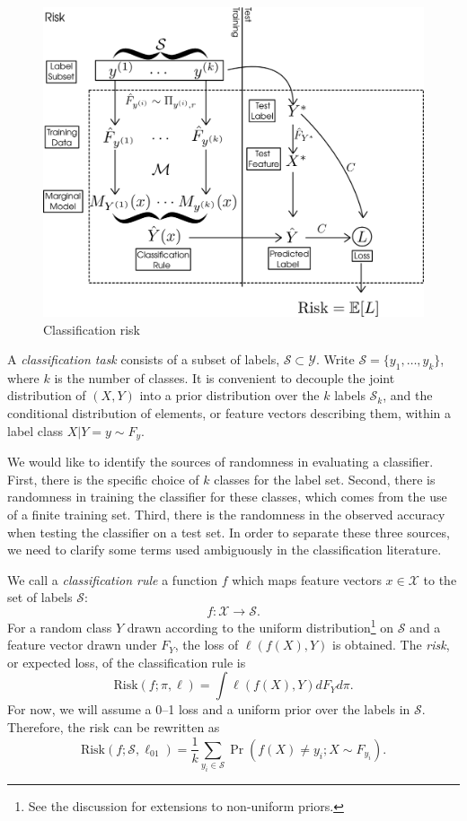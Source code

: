 \documentclass[12pt]{article}
\begin{document}
\begin{figure}[h]
\centering
\includegraphics[scale = 0.3]{extrapolation_figures/risk.png}
\caption{Classification risk}\label{fig:risk}
\end{figure}

A \emph{classification task} consists of a subset of labels,
$\mathcal{S} \subset \mathcal{Y}$. Write $\mathcal{S}=\{y_1,\hdots,
y_k\}$, where $k$ is the number of classes.  It is convenient to
decouple the joint distribution of $(X,Y)$ into a prior distribution
over the $k$ labels $\mathcal{S}_k$, and the conditional distribution
of elements, or feature vectors describing them, within a label class
$X|Y=y \sim F_y$.

We would like to identify the sources of randomness in evaluating a
classifier.  First, there is the specific choice of $k$ classes for
the label set. Second, there is randomness in training the classifier
for these classes, which comes from the use of a finite training
set. Third, there is the randomness in the observed accuracy when
testing the classifier on a test set. In order to separate these three
sources, we need to clarify some terms used ambiguously in the
classification literature.

We call a \emph{classification rule} a function $f$ which maps feature
vectors $x \in \mathcal{X}$ to the set of labels $\mathcal{S}$:
\[
f: \mathcal{X} \to \mathcal{S}.
\]
For a random class $Y$ drawn according to the uniform
distribution\footnote{See the discussion for extensions to non-uniform
priors.} on $\mathcal{S}$ and a feature vector drawn under $F_Y$, the
loss of $\ell(f(X),Y)$ is obtained.  The \emph{risk}, or expected
loss, of the classification rule is
\[\text{Risk}(f;\pi,\ell) = \int \ell(f(X),Y)dF_Y d\pi .\]
For now, we will assume a 0--1 loss and a uniform prior over the
labels in $\mathcal{S}$.  Therefore, the risk can be rewritten as
\[\text{Risk}(f;\mathcal{S}, \ell_{01}) = \frac{1}{k}\sum_{y_i\in \mathcal{S}}\Pr(f(X)\neq y_i ; X\sim F_{y_i} ).   \]
\end{document}
